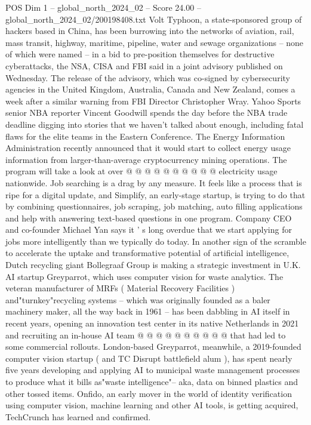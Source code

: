 \begin{textsample}{POS Dim 1 – global\_north\_2024\_02 – Score 24.00 – global\_north\_2024\_02/200198408.txt}
Volt Typhoon, a state-sponsored group of hackers based in China, has been burrowing into the networks of aviation, rail, mass transit, highway, maritime, pipeline, water and sewage organizations -- none of which were named -- in a bid to pre-position themselves for destructive cyberattacks, the NSA, CISA and FBI said in a joint advisory published on Wednesday.
The release of the advisory, which was co-signed by cybersecurity agencies in the United Kingdom, Australia, Canada and New Zealand, comes a week after a similar warning from FBI Director Christopher Wray.
Yahoo Sports senior NBA reporter Vincent Goodwill spends the day before the NBA trade deadline digging into stories that we haven't talked about enough, including fatal flaws for the elite teams in the Eastern Conference.
The Energy Information Administration recently announced that it would start to collect energy usage information from larger-than-average cryptocurrency mining operations.
The program will take a look at over @ @ @ @ @ @ @ @ @ @ electricity usage nationwide.
Job searching is a drag by any measure.
It feels like a process that is ripe for a digital update, and Simplify, an early-stage startup, is trying to do that by combining questionnaires, job scraping, job matching, auto filling applications and help with answering text-based questions in one program.
Company CEO and co-founder Michael Yan says it ' s long overdue that we start applying for jobs more intelligently than we typically do today.
In another sign of the scramble to accelerate the uptake and transformative potential of artificial intelligence, Dutch recycling giant Bollegraaf Group is making a strategic investment in U.K.
AI startup Greyparrot, which uses computer vision for waste analytics.
The veteran manufacturer of MRFs ( Material Recovery Facilities ) and"turnkey"recycling systems -- which was originally founded as a baler machinery maker, all the way back in 1961 -- has been dabbling in AI itself in recent years, opening an innovation test center in its native Netherlands in 2021 and recruiting an in-house AI team @ @ @ @ @ @ @ @ @ @ that had led to some commercial rollouts.
London-based Greyparrot, meanwhile, a 2019-founded computer vision startup ( and TC Disrupt battlefield alum ), has spent nearly five years developing and applying AI to municipal waste management processes to produce what it bills as"waste intelligence"-- aka, data on binned plastics and other tossed items.
Onfido, an early mover in the world of identity verification using computer vision, machine learning and other AI tools, is getting acquired, TechCrunch has learned and confirmed.

\end{textsample}
